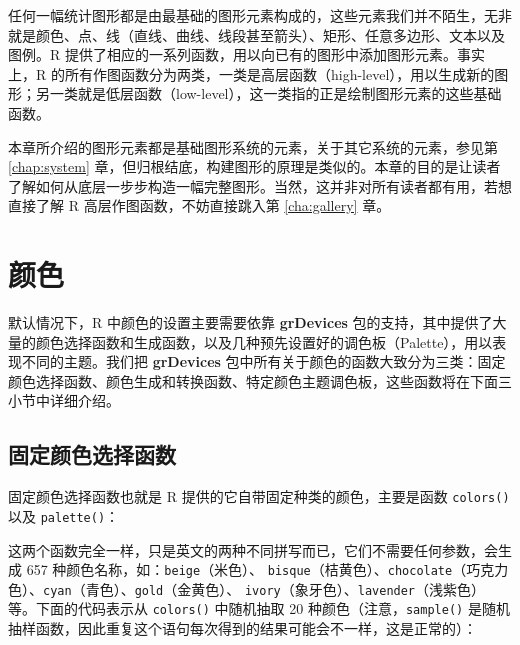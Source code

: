 \documentclass[
  b5paper,
  UTF8,twoside]{book}
\providecommand{\tightlist}{%
  \setlength{\itemsep}{0pt}\setlength{\parskip}{0pt}}
\begin{document}
任何一幅统计图形都是由最基础的图形元素构成的，这些元素我们并不陌生，无非就是颜色、点、线（直线、曲线、线段甚至箭头）、矩形、任意多边形、文本以及图例。R 提供了相应的一系列函数，用以向已有的图形中添加图形元素。事实上，R 的所有作图函数分为两类，一类是高层函数（high-level），用以生成新的图形；另一类就是低层函数（low-level），这一类指的正是绘制图形元素的这些基础函数。

本章所介绍的图形元素都是基础图形系统的元素，关于其它系统的元素，参见第 \ref{chap:system} 章，但归根结底，构建图形的原理是类似的。本章的目的是让读者了解如何从底层一步步构造一幅完整图形。当然，这并非对所有读者都有用，若想直接了解 R 高层作图函数，不妨直接跳入第 \ref{cha:gallery} 章。

\section{颜色}\label{sec:color}

默认情况下，R 中颜色的设置主要需要依靠 \textbf{grDevices} 包的支持，其中提供了大量的颜色选择函数和生成函数，以及几种预先设置好的调色板（Palette），用以表现不同的主题。我们把 \textbf{grDevices} 包中所有关于颜色的函数大致分为三类：固定颜色选择函数、颜色生成和转换函数、特定颜色主题调色板，这些函数将在下面三小节中详细介绍。

\subsection{固定颜色选择函数}\label{sec:palette}

固定颜色选择函数也就是 R 提供的它自带固定种类的颜色，主要是函数 \texttt{colors()} 以及 \texttt{palette()}：

\begin{description}
\tightlist
\item[\texttt{colors(),\ colours()}]
这两个函数完全一样，只是英文的两种不同拼写而已，它们不需要任何参数，会生成 657 种颜色名称，如：\texttt{\textquotesingle{}beige\textquotesingle{}}（米色）、 \texttt{\textquotesingle{}bisque\textquotesingle{}}（桔黄色）、\texttt{\textquotesingle{}chocolate\textquotesingle{}}（巧克力色）、\texttt{\textquotesingle{}cyan\textquotesingle{}}（青色）、\texttt{\textquotesingle{}gold\textquotesingle{}}（金黄色）、 \texttt{\textquotesingle{}ivory\textquotesingle{}}（象牙色）、\texttt{\textquotesingle{}lavender\textquotesingle{}}（浅紫色）等。下面的代码表示从 \texttt{colors()} 中随机抽取 20 种颜色（注意，\texttt{sample()} 是随机抽样函数，因此重复这个语句每次得到的结果可能会不一样，这是正常的）：
\end{description}
\end{document}
